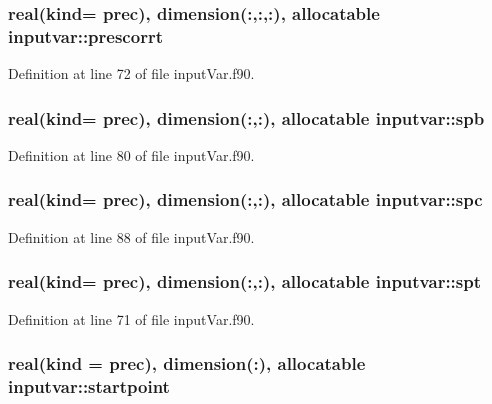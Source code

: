 \hypertarget{classinputvar_a4dc6d715b00d35dbff920be5c37c1d89}{
\subsubsection[{prescorrt}]{\setlength{\rightskip}{0pt plus 5cm}real(kind= prec), dimension(\-:,\-:,\-:), allocatable inputvar\-::prescorrt}}\label{classinputvar_a4dc6d715b00d35dbff920be5c37c1d89}


Definition at line 72 of file input\-Var.\-f90.

\hypertarget{classinputvar_acd5ae0efcfc5e54e9c73d085132bcf5a}{
\subsubsection[{spb}]{\setlength{\rightskip}{0pt plus 5cm}real(kind= prec), dimension(\-:,\-:), allocatable inputvar\-::spb}}\label{classinputvar_acd5ae0efcfc5e54e9c73d085132bcf5a}


Definition at line 80 of file input\-Var.\-f90.

\hypertarget{classinputvar_a7a6b03a57941065017f0fe71a9d641f1}{
\subsubsection[{spc}]{\setlength{\rightskip}{0pt plus 5cm}real(kind= prec), dimension(\-:,\-:), allocatable inputvar\-::spc}}\label{classinputvar_a7a6b03a57941065017f0fe71a9d641f1}


Definition at line 88 of file input\-Var.\-f90.

\hypertarget{classinputvar_aa1da1474767137ee483ef4253b7cef85}{
\subsubsection[{spt}]{\setlength{\rightskip}{0pt plus 5cm}real(kind= prec), dimension(\-:,\-:), allocatable inputvar\-::spt}}\label{classinputvar_aa1da1474767137ee483ef4253b7cef85}


Definition at line 71 of file input\-Var.\-f90.

\hypertarget{classinputvar_a3b9acf8a358a0bad89d622cbbbab638f}{
\subsubsection[{startpoint}]{\setlength{\rightskip}{0pt plus 5cm}real(kind = prec), dimension(\-:), allocatable inputvar\-::startpoint}}\label{classinputvar_a3b9acf8a358a0bad89d622cbbbab638f}


